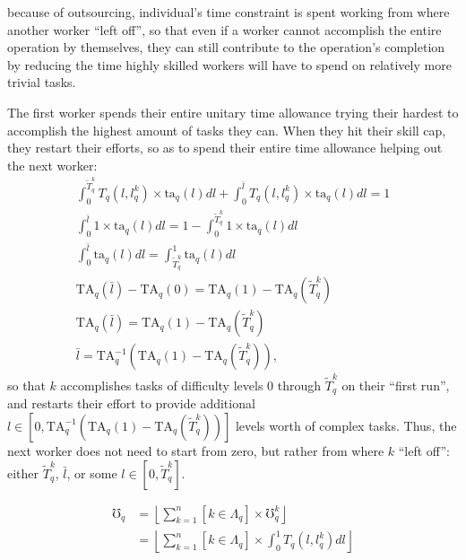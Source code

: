 \documentclass[hidelinks, nonatbib]{elsarticle}
\begin{document}
because of outsourcing, individual's time constraint is spent working from where another worker ``left off'', so that even if a worker cannot accomplish the entire operation by themselves, they can still contribute to the operation's completion by reducing the time highly skilled workers will have to spend on relatively more trivial tasks.

The first worker spends their entire unitary time allowance trying their hardest to accomplish the highest amount of tasks they can. When they hit their skill cap, they restart their efforts, so as to spend their entire time allowance helping out the next worker:
\begin{gather*}
    \int_{0}^{\tilde{T}_{q}^{k}}{
        T_{q}(l,l_{q}^{k})
        \times
        \text{ta}_{q}(l)
        dl
    }
    +
    \int_{0}^{\bar{l}}{
        T_{q}(l,l_{q}^{k})
        \times
        \text{ta}_{q}(l)
        dl
    }
    = 1
    \\
    \int_{0}^{\bar{l}}{
        1
        \times
        \text{ta}_{q}(l)
        dl
    }
    = 1 -
    \int_{0}^{\tilde{T}_{q}^{k}}{
        1
        \times
        \text{ta}_{q}(l)
        dl
    }
    \\
    \int_{0}^{\bar{l}}{
        \text{ta}_{q}(l)
        dl
    }
    = 
    \int_{\tilde{T}_{q}^{k}}^{1}{
        \text{ta}_{q}(l)
        dl
    }
    \\
    \text{TA}_{q}(\bar{l}) -
    \text{TA}_{q}(0)
    = 
    \text{TA}_{q}(1) -
    \text{TA}_{q}(\tilde{T}_{q}^{k})
    \\
    \text{TA}_{q}(\bar{l})
    = 
    \text{TA}_{q}(1) -
    \text{TA}_{q}(\tilde{T}_{q}^{k})
    \\
    \bar{l}
    = 
    \text{TA}_{q}^{-1}
    \left(
        \text{TA}_{q}(1) -
        \text{TA}_{q}(\tilde{T}_{q}^{k})
    \right)
    ,
\end{gather*}
so that $k$ accomplishes tasks of difficulty levels $0$ through $\tilde{T}_{q}^{k}$ on their ``first run'', and restarts their effort to provide additional $l \in \left[0,\text{TA}_{q}^{-1}
\left(
    \text{TA}_{q}(1) -
    \text{TA}_{q}(\tilde{T}_{q}^{k})
\right)
\right]$ levels worth of complex tasks. Thus, the next worker does not need to start from zero, but rather from where $k$ ``left off'': either $\tilde{T}_{q}^{k}$, $\bar{l}$, or some $l \in [0, \tilde{T}_{q}^{k}]$.
        
\begin{align*}
    \mho_q 
    &= 
    \left\lfloor
    \sum_{k=1}^{n}{
        [k \in \Lambda_q]
        \times
        \mho_{q}^{k}
    }
    \right\rfloor
    \\
    &= 
    \left\lfloor
    \sum_{k=1}^{n}{
        [k \in \Lambda_q]
        \times
        \int_{0}^{1}{
            T_{q}(l,l_{q}^{k})
            dl
        }
    }
    \right\rfloor
\end{align*}
\end{document}
